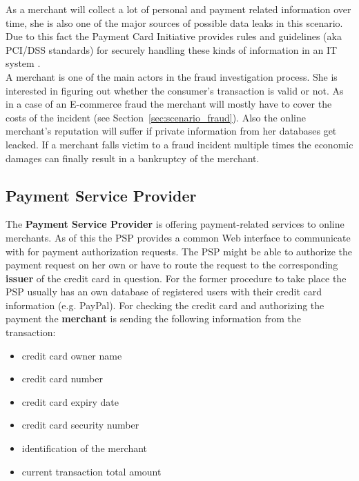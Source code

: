 As a merchant will collect a lot of personal and payment related information over time, she is also one of the major sources of possible data leaks in this scenario. Due to this fact the Payment Card Initiative provides rules and guidelines (aka PCI/DSS standards) for securely handling these kinds of information in an IT system \citep{dss2014payment}. \\

A merchant is one of the main actors in the fraud investigation process. She is interested in figuring out whether the consumer's transaction is valid or not. As in a case of an E-commerce fraud the merchant will mostly have to cover the costs of the incident (see Section~\ref{sec:scenario_fraud}). Also the online merchant's reputation will suffer if private information from her databases get leacked. If a merchant falls victim to a fraud incident multiple times the economic damages can finally result in a bankruptcy of the merchant.


\subsection{Payment Service Provider}
\label{subsec:stakeholder_psp}

The \textbf{Payment Service Provider} is offering payment-related services to online merchants. As of this the \gls{PSP} provides a common Web interface to communicate with for payment authorization requests. The \gls{PSP} might be able to authorize the payment request on her own or have to route the request to the corresponding \textbf{issuer} of the credit card in question. For the former procedure to take place the \gls{PSP} usually has an own database of registered users with their credit card information (e.g. PayPal). For checking the credit card and authorizing the payment the \textbf{merchant} is sending the following information from the transaction:\@

\begin{itemize}
		\item credit card owner name
		\item credit card number
		\item credit card expiry date
		\item credit card security number
		\item identification of the merchant
		\item current transaction total amount
\end{itemize}

